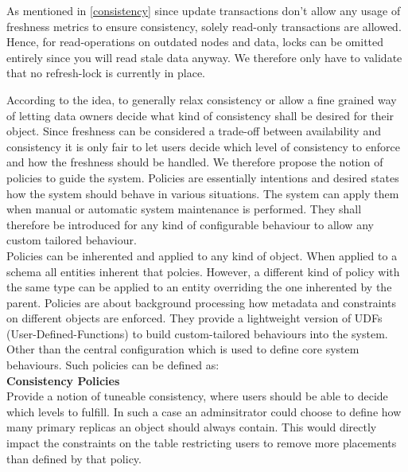 As mentioned in \ref{consistency} since update transactions don't allow any usage of freshness metrics to ensure consistency, solely read-only transactions are allowed.
Hence, for read-operations on outdated nodes and data, locks can be omitted entirely since you will read stale data anyway.
We therefore only have to validate that no refresh-lock is currently in place.





\label{sec:polcies}

According to the idea, to generally relax consistency or allow a fine grained way of letting data owners decide what kind of consistency shall be desired for their object. 
Since freshness can be considered a trade-off between availability and consistency it is only fair to let users decide which level of consistency to enforce and 
how the freshness should be handled. We therefore propose the notion of policies to guide the system.
Policies are essentially intentions and desired states how the system should behave in various situations. 
The system can apply them when manual or automatic system maintenance is performed.
They shall therefore be introduced for any kind of configurable behaviour to allow any custom tailored behaviour. \\

Policies can be inherented and applied to any kind of object. When applied to a schema all entities inherent that polcies.
However, a different kind of policy with the same type can be applied to an entity overriding the one inherented by the parent.
Policies are about background processing how metadata and constraints on different objects are enforced. 
They provide a lightweight version of UDFs (User-Defined-Functions) to build custom-tailored behaviours into the system.
Other than the central configuration which is used to define core system behaviours. 
Such policies can be defined as:\\


\textbf{Consistency Policies}\\
Provide a notion of tuneable consistency, where users should be able to decide which levels to fulfill.
In such a case an adminsitrator could choose to define how many primary replicas an object should always contain.
This would directly impact the constraints on the table restricting users to remove more placements than defined by that policy.\\


